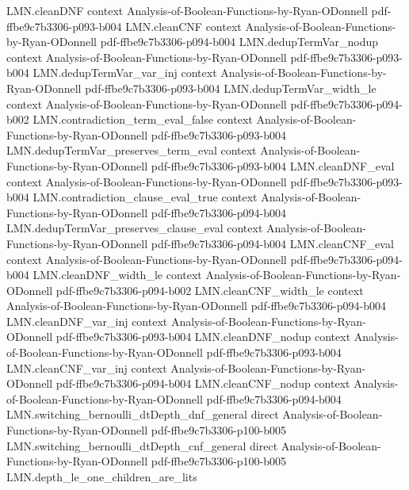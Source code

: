 \begin{lemma}
  {LMN.cleanDNF}
  {context}
  {Analysis-of-Boolean-Functions-by-Ryan-ODonnell}
  {pdf-ffbe9c7b3306-p093-b004}
\proofstep
  {LMN.cleanCNF}
  {context}
  {Analysis-of-Boolean-Functions-by-Ryan-ODonnell}
  {pdf-ffbe9c7b3306-p094-b004}
\proofstep
  {LMN.dedupTermVar_nodup}
  {context}
  {Analysis-of-Boolean-Functions-by-Ryan-ODonnell}
  {pdf-ffbe9c7b3306-p093-b004}
\proofstep
  {LMN.dedupTermVar_var_inj}
  {context}
  {Analysis-of-Boolean-Functions-by-Ryan-ODonnell}
  {pdf-ffbe9c7b3306-p093-b004}
\proofstep
  {LMN.dedupTermVar_width_le}
  {context}
  {Analysis-of-Boolean-Functions-by-Ryan-ODonnell}
  {pdf-ffbe9c7b3306-p094-b002}
\proofstep
  {LMN.contradiction_term_eval_false}
  {context}
  {Analysis-of-Boolean-Functions-by-Ryan-ODonnell}
  {pdf-ffbe9c7b3306-p093-b004}
\proofstep
  {LMN.dedupTermVar_preserves_term_eval}
  {context}
  {Analysis-of-Boolean-Functions-by-Ryan-ODonnell}
  {pdf-ffbe9c7b3306-p093-b004}
\proofstep
  {LMN.cleanDNF_eval}
  {context}
  {Analysis-of-Boolean-Functions-by-Ryan-ODonnell}
  {pdf-ffbe9c7b3306-p093-b004}
\proofstep
  {LMN.contradiction_clause_eval_true}
  {context}
  {Analysis-of-Boolean-Functions-by-Ryan-ODonnell}
  {pdf-ffbe9c7b3306-p094-b004}
\proofstep
  {LMN.dedupTermVar_preserves_clause_eval}
  {context}
  {Analysis-of-Boolean-Functions-by-Ryan-ODonnell}
  {pdf-ffbe9c7b3306-p094-b004}
\proofstep
  {LMN.cleanCNF_eval}
  {context}
  {Analysis-of-Boolean-Functions-by-Ryan-ODonnell}
  {pdf-ffbe9c7b3306-p094-b004}
\proofstep
  {LMN.cleanDNF_width_le}
  {context}
  {Analysis-of-Boolean-Functions-by-Ryan-ODonnell}
  {pdf-ffbe9c7b3306-p094-b002}
\proofstep
  {LMN.cleanCNF_width_le}
  {context}
  {Analysis-of-Boolean-Functions-by-Ryan-ODonnell}
  {pdf-ffbe9c7b3306-p094-b004}
\proofstep
  {LMN.cleanDNF_var_inj}
  {context}
  {Analysis-of-Boolean-Functions-by-Ryan-ODonnell}
  {pdf-ffbe9c7b3306-p093-b004}
\proofstep
  {LMN.cleanDNF_nodup}
  {context}
  {Analysis-of-Boolean-Functions-by-Ryan-ODonnell}
  {pdf-ffbe9c7b3306-p093-b004}
\proofstep
  {LMN.cleanCNF_var_inj}
  {context}
  {Analysis-of-Boolean-Functions-by-Ryan-ODonnell}
  {pdf-ffbe9c7b3306-p094-b004}
\proofstep
  {LMN.cleanCNF_nodup}
  {context}
  {Analysis-of-Boolean-Functions-by-Ryan-ODonnell}
  {pdf-ffbe9c7b3306-p094-b004}
\proofstep
  {LMN.switching_bernoulli_dtDepth_dnf_general}
  {direct}
  {Analysis-of-Boolean-Functions-by-Ryan-ODonnell}
  {pdf-ffbe9c7b3306-p100-b005}
\proofstep
  {LMN.switching_bernoulli_dtDepth_cnf_general}
  {direct}
  {Analysis-of-Boolean-Functions-by-Ryan-ODonnell}
  {pdf-ffbe9c7b3306-p100-b005}
\proofstep
  {LMN.depth_le_one_children_are_lits}

\end{lemma}
